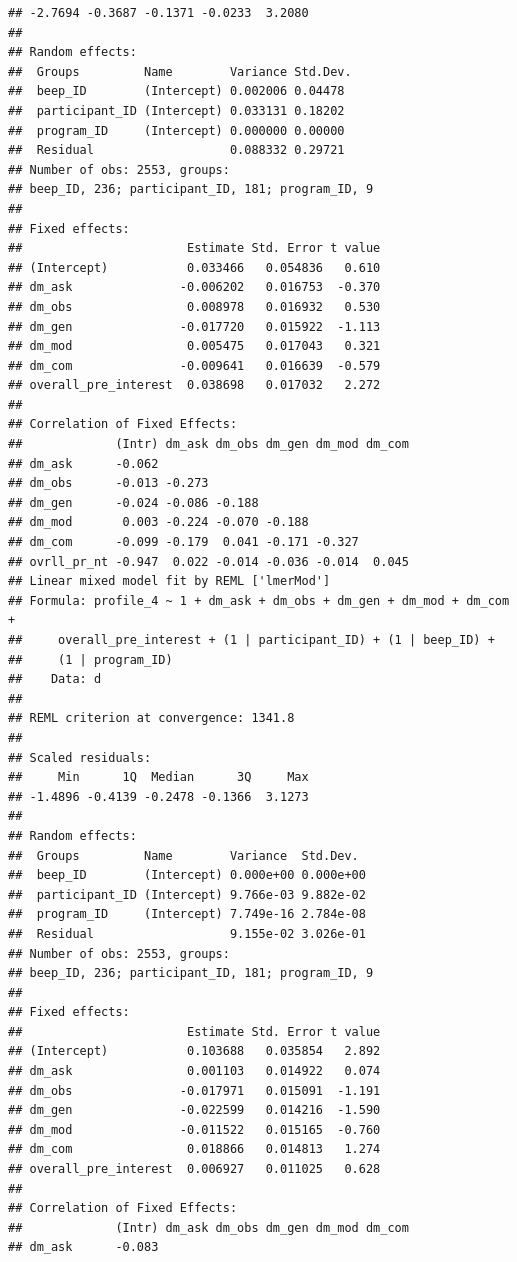 \documentclass[]{msu-thesis}
\theoremstyle{definition}
\theoremstyle{definition}
\theoremstyle{definition}
\theoremstyle{remark}
\begin{document}
\begin{verbatim}
## -2.7694 -0.3687 -0.1371 -0.0233  3.2080 
## 
## Random effects:
##  Groups         Name        Variance Std.Dev.
##  beep_ID        (Intercept) 0.002006 0.04478 
##  participant_ID (Intercept) 0.033131 0.18202 
##  program_ID     (Intercept) 0.000000 0.00000 
##  Residual                   0.088332 0.29721 
## Number of obs: 2553, groups:  
## beep_ID, 236; participant_ID, 181; program_ID, 9
## 
## Fixed effects:
##                       Estimate Std. Error t value
## (Intercept)           0.033466   0.054836   0.610
## dm_ask               -0.006202   0.016753  -0.370
## dm_obs                0.008978   0.016932   0.530
## dm_gen               -0.017720   0.015922  -1.113
## dm_mod                0.005475   0.017043   0.321
## dm_com               -0.009641   0.016639  -0.579
## overall_pre_interest  0.038698   0.017032   2.272
## 
## Correlation of Fixed Effects:
##             (Intr) dm_ask dm_obs dm_gen dm_mod dm_com
## dm_ask      -0.062                                   
## dm_obs      -0.013 -0.273                            
## dm_gen      -0.024 -0.086 -0.188                     
## dm_mod       0.003 -0.224 -0.070 -0.188              
## dm_com      -0.099 -0.179  0.041 -0.171 -0.327       
## ovrll_pr_nt -0.947  0.022 -0.014 -0.036 -0.014  0.045
## Linear mixed model fit by REML ['lmerMod']
## Formula: profile_4 ~ 1 + dm_ask + dm_obs + dm_gen + dm_mod + dm_com +  
##     overall_pre_interest + (1 | participant_ID) + (1 | beep_ID) +  
##     (1 | program_ID)
##    Data: d
## 
## REML criterion at convergence: 1341.8
## 
## Scaled residuals: 
##     Min      1Q  Median      3Q     Max 
## -1.4896 -0.4139 -0.2478 -0.1366  3.1273 
## 
## Random effects:
##  Groups         Name        Variance  Std.Dev. 
##  beep_ID        (Intercept) 0.000e+00 0.000e+00
##  participant_ID (Intercept) 9.766e-03 9.882e-02
##  program_ID     (Intercept) 7.749e-16 2.784e-08
##  Residual                   9.155e-02 3.026e-01
## Number of obs: 2553, groups:  
## beep_ID, 236; participant_ID, 181; program_ID, 9
## 
## Fixed effects:
##                       Estimate Std. Error t value
## (Intercept)           0.103688   0.035854   2.892
## dm_ask                0.001103   0.014922   0.074
## dm_obs               -0.017971   0.015091  -1.191
## dm_gen               -0.022599   0.014216  -1.590
## dm_mod               -0.011522   0.015165  -0.760
## dm_com                0.018866   0.014813   1.274
## overall_pre_interest  0.006927   0.011025   0.628
## 
## Correlation of Fixed Effects:
##             (Intr) dm_ask dm_obs dm_gen dm_mod dm_com
## dm_ask      -0.083                                   

\end{verbatim}
\end{document}

